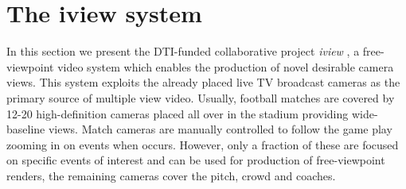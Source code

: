 
\section{The iview system}
In this section we present the DTI-funded collaborative project \textit{iview} \cite{iview_project},
a free-viewpoint video system which enables the production of novel desirable camera views.
This system exploits the already placed live TV broadcast cameras as the primary
source of multiple view video.
Usually, football matches are covered by 12-20 high-definition cameras placed all over in the stadium
providing wide-baseline views.
Match cameras are manually controlled to follow the game play zooming in on events when occurs.
However, only a fraction of these are focused on specific events of interest and can be used for production 
of free-viewpoint renders, the remaining cameras cover the pitch, crowd and coaches.






